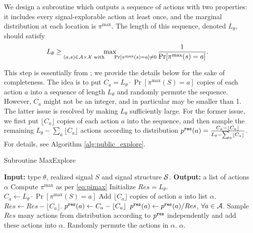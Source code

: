 We design a subroutine  which outputs a sequence of actions with two properties: it includes every signal-explorable action at least once, and the marginal distribution at each location is $\pi^{\max}$. The length of this sequence, denoted $L_{\theta}$, should satisfy
\begin{align}\label{eq:public-L}
L_{\theta} \geq \max_{(a,s)\in \A\times \X \text{ with }\quad \Pr[\pi^{\max}(s)=a] \neq 0} \frac{1}{\Pr[\pi^{\max}(s)=a]}.
\end{align}

This step is essentially from \cite{ICexplorationGames-ec16-working};
 we provide the details below for the sake of completeness.
The idea is to put $C_a = L_{\theta} \cdot \Pr[\pi^{\max}(S) = a]$ copies of each action $a$ into a sequence of length $L_{\theta}$ and randomly permute the sequence.
 However, $C_a$ might not be an integer, and in particular may be smaller than 1. The latter issue is resolved by making $L_{\theta}$ sufficiently large. For the former issue, we first put $\lfloor C_a \rfloor$ copies of each action $a$ into the sequence, and then sample the remaining
    $L_\theta - \sum_a \lfloor C_a \rfloor$
actions according to distribution
    $\pRes(a) = \frac{C_a - \lfloor C_a \rfloor}{L_\theta - \sum_a \lfloor C_a \rfloor}$.
For details, see Algorithm \ref{alg:public_explore}.
 \begin{algorithm}[H]
    \caption{Subroutine MaxExplore}
    	\label{alg:public_explore}
    \begin{algorithmic}[1]
	\STATE \textbf{Input:} type $\theta$, realized signal $S$ and signal structure $\S$.
	\STATE \textbf{Output:} a list of actions $\alpha$
	\STATE Compute $\pi^{\max}$ as per \eqref{eq:pimax}
		\STATE Initialize $Res = L_{\theta}$.
							\STATE $C_a \leftarrow  L_{\theta} \cdot \Pr[\pi^{\max}(S) = a]$
                     		\STATE Add $\lfloor C_a \rfloor$ copies of action $a$ into list $\alpha$.
			\STATE $Res \leftarrow Res -\lfloor C_a \rfloor $.
			\STATE $\pRes(a)\leftarrow  C_a -  \lfloor C_a\rfloor$
		\ENDFOR
		\STATE $\pRes(a) \leftarrow \pRes(a) / Res$, $\forall a \in \A$.
		\STATE Sample $Res$ many actions from distribution according to $\pRes$ independently and add these actions into $\alpha$.
		\STATE Randomly permute the actions in $\alpha$.
	\RETURN $\alpha$.	
     \end{algorithmic}
\end{algorithm}

